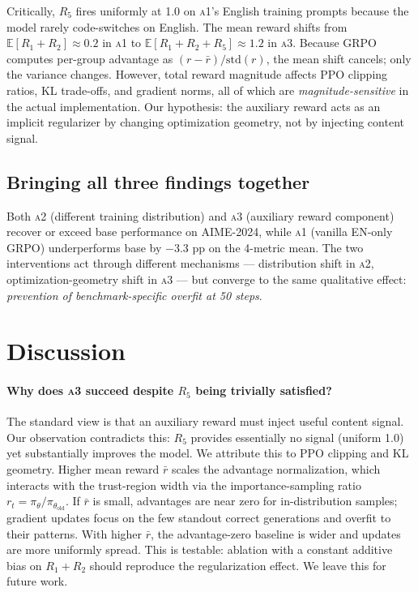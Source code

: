 \documentclass[11pt]{article}
\newcommand{\armA}{\textsc{a1}}
\newcommand{\armB}{\textsc{a2}}
\newcommand{\armC}{\textsc{a3}}
\begin{document}
Critically, $R_5$ fires uniformly at 1.0 on \armA{}'s English training prompts
because the model rarely code-switches on English. The mean reward shifts from
$\mathbb{E}[R_1+R_2]\approx 0.2$ in \armA{} to $\mathbb{E}[R_1+R_2+R_5]\approx 1.2$
in \armC{}. Because GRPO computes per-group advantage as
$(r - \bar{r})/\text{std}(r)$, the mean shift cancels; only the variance changes.
However, total reward magnitude affects PPO clipping ratios, KL trade-offs, and
gradient norms, all of which are \emph{magnitude-sensitive} in the actual
implementation. Our hypothesis: the auxiliary reward acts as an implicit
regularizer by changing optimization geometry, not by injecting content signal.

\subsection{Bringing all three findings together}
Both \armB{} (different training distribution) and \armC{} (auxiliary reward
component) recover or exceed base performance on AIME-2024, while \armA{}
(vanilla EN-only GRPO) underperforms base by $-3.3$ pp on the 4-metric mean.
The two interventions act through different mechanisms --- distribution shift in
\armB{}, optimization-geometry shift in \armC{} --- but converge to the same
qualitative effect: \emph{prevention of benchmark-specific overfit at 50 steps}.

\section{Discussion}
\label{sec:discussion}

\paragraph{Why does \armC{} succeed despite $R_5$ being trivially satisfied?}
The standard view is that an auxiliary reward must inject useful content signal.
Our observation contradicts this: $R_5$ provides essentially no signal (uniform 1.0)
yet substantially improves the model. We attribute this to PPO clipping and KL
geometry. Higher mean reward $\bar{r}$ scales the advantage normalization, which
interacts with the trust-region width via the importance-sampling ratio
$r_t = \pi_\theta/\pi_{\theta_{\text{old}}}$. If $\bar{r}$ is small, advantages are
near zero for in-distribution samples; gradient updates focus on the few standout
correct generations and overfit to their patterns. With higher $\bar{r}$,
the advantage-zero baseline is wider and updates are more uniformly spread.
This is testable: ablation with a constant additive bias on $R_1+R_2$ should
reproduce the regularization effect. We leave this for future work.
\end{document}
